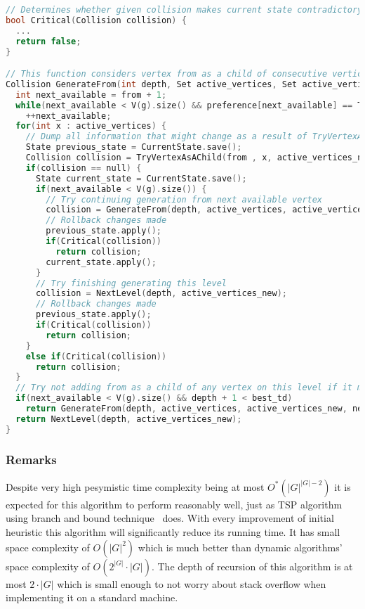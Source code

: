 \begin{lstlisting}[language=C++]
// Determines whether given collision makes current state contradictory with treedepth decomposition definition
bool Critical(Collision collision) {
  ...
  return false;
}

// This function considers vertex from as a child of consecutive vertices from active_vertices. At the time of calling this function, every vertex v < from has been considered on this level to some extent. Note that calling this function does not change current state i.e. after this function returns state is how it was before the call. It is required that preference[from] != Taken.
Collision GenerateFrom(int depth, Set active_vertices, Set active_vertices_new, int from) {
  int next_available = from + 1;
  while(next_available < V(g).size() && preference[next_available] == Taken)
    ++next_available;
  for(int x : active_vertices) {
    // Dump all information that might change as a result of TryVertexAsAChild
    State previous_state = CurrentState.save();
    Collision collision = TryVertexAsAChild(from , x, active_vertices_new);
    if(collision == null) {
      State current_state = CurrentState.save();
      if(next_available < V(g).size()) {
        // Try continuing generation from next available vertex
        collision = GenerateFrom(depth, active_vertices, active_vertices_new, next_available);
        // Rollback changes made
        previous_state.apply();
        if(Critical(collision))
          return collision;
        current_state.apply();
      }
      // Try finishing generating this level
      collision = NextLevel(depth, active_vertices_new);
      // Rollback changes made
      previous_state.apply();
      if(Critical(collision))
        return collision;
    }
    else if(Critical(collision))
      return collision;
  }
  // Try not adding from as a child of any vertex on this level if it makes sense
  if(next_available < V(g).size() && depth + 1 < best_td)
    return GenerateFrom(depth, active_vertices, active_vertices_new, next_available);
  return NextLevel(depth, active_vertices_new);
}
\end{lstlisting}
\subsubsection{Remarks}
Despite very high pesymistic time complexity being at most $O^*\left(\left|G\right|^{\left|G\right|-2}\right)$ it is expected for this algorithm to perform reasonably well, just as TSP algorithm using branch and bound technique~\cite{tsp_bnb} does. With every improvement of initial heuristic this algorithm will significantly reduce its running time. It has small space complexity of $O\left(\left|G\right|^2\right)$ which is much better than dynamic algorithms' space complexity of $O\left(2^{\left|G\right|}\cdot\left|G\right|\right)$. The depth of recursion of this algorithm is at most $2\cdot\left|G\right|$ which is small enough to not worry about stack overflow when implementing it on a standard machine.
